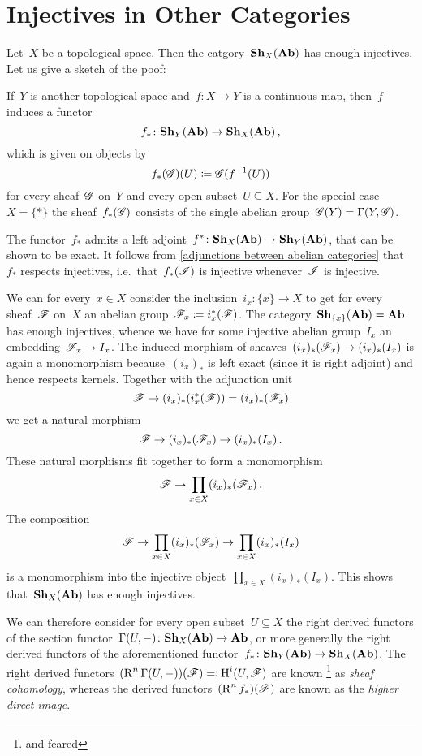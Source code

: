 \section{Injectives in Other Categories}


\begin{example}
  Let~$X$ be a topological space.
  Then the catgory~$\mathbf{Sh}_X(\mathbf{Ab})$ has enough injectives.
  Let us give a sketch of the poof:
  
  If~$Y$ is another topological space and~$f \colon X \to Y$ is a continuous map, then~$f$ induces a functor
  \[
    f_*
    \colon
    \mathbf{Sh}_Y(\mathbf{Ab})
    \to
    \mathbf{Sh}_X(\mathbf{Ab})  \,,
  \]
  which is given on objects by
  \[
    f_*(\mathscr{G})(U)
    \coloneqq
    \mathscr{G}(f^{-1}(U))
  \]
  for every sheaf~$\mathscr{G}$ on~$Y$ and every open subset~$U \subseteq X$.
  For the special case~$X = \{\ast\}$ the sheaf~$f_*(\mathscr{G})$ consists of the single abelian group~$\mathscr{G}(Y) = \Gamma(Y,\mathscr{G})$.
  
  The functor~$f_*$ admits a left adjoint~$f^* \colon \mathbf{Sh}_X(\mathbf{Ab}) \to \mathbf{Sh}_Y(\mathbf{Ab})$, that can be shown to be exact.
  It follows from \cref{adjunctions between abelian categories} that~$f_*$ respects injectives, i.e.\ that~$f_*(\mathscr{I})$ is injective whenever~$\mathscr{I}$ is injective.
  
  We can for every~$x \in X$ consider the inclusion~$i_x \colon \{x\} \to X$ to get for every sheaf~$\mathscr{F}$ on~$X$ an abelian group~$\mathscr{F}_x \coloneqq i_x^*(\mathscr{F})$.
  The category~$\mathbf{Sh}_{\{x\}}(\mathbf{Ab}) = \mathbf{Ab}$ has enough injectives, whence we have for some injective abelian group~$I_x$ an embedding~$\mathscr{F}_x \to I_x$.
  The induced morphism of sheaves~$(i_x)_*(\mathscr{F}_x) \to (i_x)_*(I_x)$ is again a monomorphism because~$(i_x)_*$ is left exact (since it is right adjoint) and hence respects kernels.
  Together with the adjunction unit
  \[
    \mathscr{F}
    \to
    (i_x)_*( i_x^*(\mathscr{F}) )
    =
    (i_x)_*( \mathscr{F}_x )
  \]
  we get a natural morphism
  \[
    \mathscr{F}
    \to
    (i_x)_*( \mathscr{F}_x )
    \to
    (i_x)_*(I_x)  \,.
  \]
  These natural morphisms fit together to form a monomorphism
  \[
    \mathscr{F}
    \to
    \prod_{x \in X} (i_x)_*(\mathscr{F}_x)  \,.
  \]
  The composition
  \[
    \mathscr{F}
    \to
    \prod_{x \in X} (i_x)_*(\mathscr{F}_x)
    \to
    \prod_{x \in X} (i_x)_*(I_x)
  \]
  is a monomorphism into the injective object~$\prod_{x \in X} (i_x)_*(I_x)$.
  This shows that~$\mathbf{Sh}_X(\mathbf{Ab})$ has enough injectives.
  
  We can therefore consider for every open subset~$U \subseteq X$ the right derived functors of the section functor~$\Gamma(U, -) \colon \mathbf{Sh}_X(\mathbf{Ab}) \to \mathbf{Ab}$, or more generally the right derived functors of the aforementioned functor~$f_* \colon \mathbf{Sh}_Y(\mathbf{Ab}) \to \mathbf{Sh}_X(\mathbf{Ab})$.
  The right derived functors~$(\operatorname{R}^n \Gamma(U,-))(\mathscr{F}) \eqqcolon \operatorname{H}^i(U,\mathscr{F})$ are known%
  \footnote{and feared}
  as \emph{sheaf cohomology}, whereas the derived functors~$(\operatorname{R}^n f_*)(\mathscr{F})$ are known as the \emph{higher direct image}.
\end{example}





